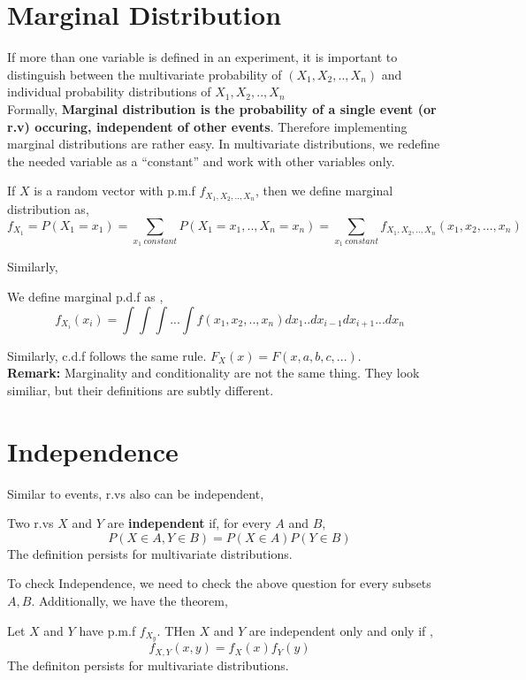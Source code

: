\section{Marginal Distribution}
If more than one variable is defined in an experiment, it is important to distinguish between the multivariate probability of
$(X_1,X_2,..,X_n)$ and individual probability distributions of $X_1,X_2,..,X_n$\\

Formally, \textbf{Marginal distribution is the probability of a single event (or r.v) occuring, independent of other events}. Therefore
implementing marginal distributions are rather easy. In multivariate distributions, we redefine the needed variable as a ``constant'' and
work with other variables only.
\begin{definition}
    If $X$ is a random vector with p.m.f $f_{X_1,X_2,..,X_n}$, then we define marginal distribution as,
    \[f_{X_1}= P(X_1 = x_1)= \sum_{x_1 \ constant} P(X_1=x_1,..,X_n=x_n)= \sum_{x_1\ constant} f_{X_1,X_2,..,X_n}(x_1,x_2,...,x_n)\]
\end{definition}
Similarly,
\begin{definition}
    We define marginal p.d.f as ,
    \[f_{X_i}(x_i) =  \int \int \int ... \int f(x_1,x_2,..,x_n)dx_1..dx_{i-1}dx_{i+1}...dx_n \]
\end{definition}
Similarly, c.d.f follows the same rule. $F_X(x)= F(x,a,b,c,...)$. \\
\textbf{Remark:} Marginality and conditionality are not the same thing. They look similiar, but their definitions are subtly different.
\par
\section{Independence}
Similar to events, r.vs also can be independent,
\begin{definition}
    Two r.vs $X$ and $Y$ are \textbf{independent} if, for every $A$ and $B$,
    \[P(X \in A, Y \in B)= P(X \in A)P(Y \in B)\]
    The definition persists for multivariate distributions.
\end{definition}
To check Independence, we need to check the above question for every subsets $A,B$. Additionally, we have the theorem,
\begin{theorem}
    Let $X$ and $Y$ have p.m.f $f_{X_y}$. THen $X$ and $Y$ are independent only and only if ,
    \[f_{X,Y}(x,y)=f_X(x)f_Y(y) \]
    The definiton persists for multivariate distributions.
\end{theorem}

